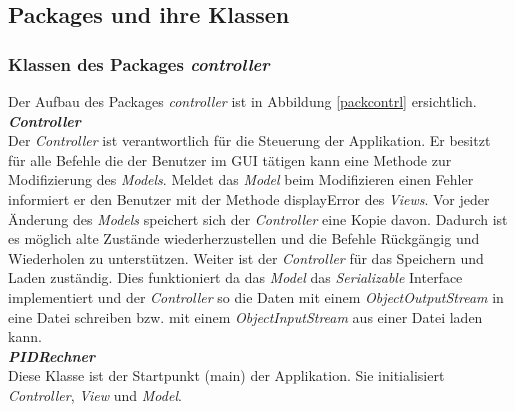 \newpage
\subsection{Packages und ihre Klassen}

\subsubsection{Klassen des Packages \textit{controller}}
Der Aufbau des Packages \textit{controller} ist in Abbildung \ref{packcontrl} ersichtlich.\\

\textit{\textbf{Controller}}\\
Der \textit{Controller} ist verantwortlich für die Steuerung der Applikation. Er besitzt für alle Befehle die der Benutzer im GUI tätigen kann eine Methode zur Modifizierung des \textit{Models}. Meldet das \textit{Model} beim Modifizieren einen Fehler informiert er den Benutzer mit der Methode displayError des \textit{Views}. Vor jeder Änderung des \textit{Models} speichert sich der \textit{Controller} eine Kopie davon. Dadurch ist es möglich alte Zustände wiederherzustellen und die Befehle Rückgängig und Wiederholen zu unterstützen. Weiter ist der \textit{Controller} für das Speichern und Laden zuständig. Dies funktioniert da das \textit{Model} das \textit{Serializable} Interface implementiert und der \textit{Controller} so die Daten mit einem \textit{ObjectOutputStream} in eine Datei schreiben bzw. mit einem \textit{ObjectInputStream} aus einer Datei laden kann.\\

\textit{\textbf{PIDRechner}}\\
Diese Klasse ist der Startpunkt (main) der Applikation. Sie initialisiert \textit{Controller}, \textit{View} und \textit{Model}.

